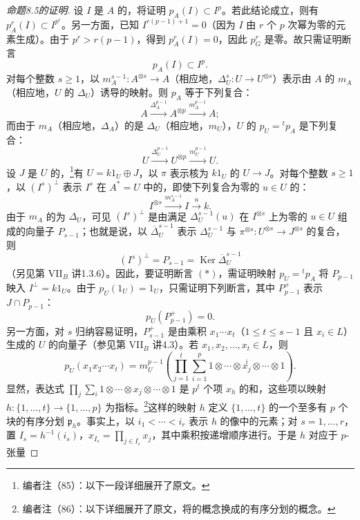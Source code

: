 \begin{proof}[命题8.5的证明]
设 $I$ 是 $A$ 的，将证明 $p_A(I)\subset I^p$。若此结论成立，则有 $p_A^r(I)\subset I^{p^r}$。另一方面，已知 $I^{r(p-1)+1}=0$（因为 $I$ 由 $r$ 个 $p$ 次幂为零的元素生成）。由于 $p^r>r(p-1)$，得到 $p_A^r(I)=0$，因此 $p_G^r$ 是零。故只需证明断言
\[
 p_A(I)\subset I^p.\tag{*}
\]
对每个整数 $s\ge1$，以 $m_A^{s-1}:A^{\otimes s}\to A$（相应地，$\Delta_U^s:U\to U^{\otimes s}$）表示由 $A$ 的 $m_A$（相应地，$U$ 的 $\Delta_U$）诱导的映射。则 $p_A$ 等于下列复合：
\[
 A\xrightarrow{\Delta_A^{p-1}}A^{\otimes p}\xrightarrow{m_A^{p-1}}A;
\]
而由于 $m_A$（相应地，$\Delta_A$）的是 $\Delta_U$（相应地，$m_U$），$U$ 的 $p_U={}^tp_A$ 是下列复合：
\[
 U\xrightarrow{\Delta_U^{p-1}}U^{\otimes p}\xrightarrow{m_U^{p-1}}U.
\]
设 $J$ 是 $U$ 的，\footnote{编者注（85）：以下一段详细展开了原文。}有 $U=k1_U\oplus J$，以 $\pi$ 表示核为 $k1_U$ 的 $U\to J$。对每个整数 $s\ge1$，以 $(I^s)^\perp$ 表示 $I^s$ 在 $A^*=U$ 中的，即使下列复合为零的 $u\in U$ 的：
\[
 I^{\otimes s}\xrightarrow{m_A^{s-1}}I\xrightarrow{u}k.
\]
由于 $m_A$ 的为 $\Delta_U$，可见 $(I^s)^\perp$ 是由满足 $\Delta_U^{s-1}(u)$ 在 $I^{\otimes s}$ 上为零的 $u\in U$ 组成的向量子 $P_{s-1}$；也就是说，以 $\overline\Delta_U^{s-1}$ 表示 $\Delta_U^{s-1}$ 与 $\pi^{\otimes s}:U^{\otimes s}\to J^{\otimes s}$ 的复合，则
\[
 (I^s)^\perp=P_{s-1}=\operatorname{Ker}\overline\Delta_U^{s-1}
\]
（另见第 VII$_B$ 讲1.3.6）。因此，要证明断言 $(*)$，需证明映射 $p_U={}^tp_A$ 将 $P_{p-1}$ 映入 $I^\perp=k1_U$。由于 $p_U(1_U)=1_U$，只需证明下列断言，其中 $P_{p-1}^+$ 表示 $J\cap P_{p-1}$：
\[
 p_U(P_{p-1}^+)=0.\tag{**}
\]
另一方面，对 $s$ 归纳容易证明，$P_{s-1}^+$ 是由乘积 $x_1\cdots x_t$（$1\le t\le s-1$ 且 $x_i\in L$）生成的 $U$ 的向量子（参见第 VII$_B$ 讲4.3）。若 $x_1,x_2,\ldots,x_t\in L$，则
\[
 p_U(x_1x_2\cdots x_t)=m_U^{p-1}\left(
 \prod_{j=1}^t\sum_{i=1}^p
 1\otimes\cdots\otimes\overset{i}{x_j}\otimes\cdots\otimes1\right).
\]
显然，表达式 $\prod_j\sum_i1\otimes\cdots\otimes x_j\otimes\cdots\otimes1$ 是 $p^t$ 个项 $x_h$ 的和，这些项以映射 $h:\{1,\ldots,t\}\to\{1,\ldots,p\}$ 为指标。\footnote{编者注（86）：以下详细展开了原文，将的概念换成的有序分划的概念。}这样的映射 $h$ 定义 $\{1,\ldots,t\}$ 的一个至多有 $p$ 个块的有序分划 $\mathfrak p_h$。事实上，以 $i_1<\cdots<i_r$ 表示 $h$ 的像中的元素；对 $s=1,\ldots,r$，置 $I_s=h^{-1}(i_s)$，$x_{I_s}=\prod_{j\in I_s}x_j$，其中乘积按递增顺序进行。于是 $h$ 对应于 $p$-张量

\end{proof}
